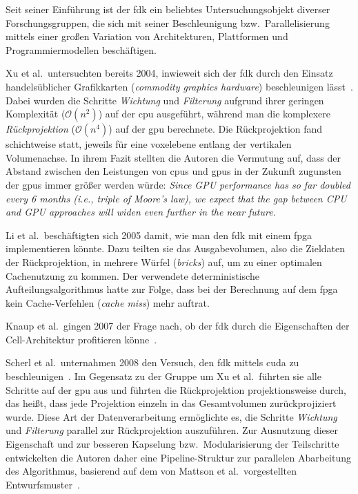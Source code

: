 Seit seiner Einführung ist der \gls{fdk} ein beliebtes Untersuchungsobjekt diverser Forschungsgruppen, die sich mit
seiner Beschleunigung bzw.\ Parallelisierung mittels einer großen Variation von Architekturen, Plattformen und
Programmiermodellen beschäftigen. 

Xu et al.\ untersuchten bereits 2004, inwieweit sich der \gls{fdk} durch den Einsatz handelsüblicher Grafikkarten
(\textit{commodity graphics hardware}) beschleunigen lässt~\cite{xumuell}. Dabei wurden die Schritte \textit{Wichtung}
und \textit{Filterung} aufgrund ihrer geringen Komplexität ($\mathcal{O}(n^2)$) auf der \gls{cpu} ausgeführt, während
man die komplexere \textit{Rückprojektion} ($\mathcal{O}(n^4)$) auf der \gls{gpu} berechnete. Die Rückprojektion fand
schichtweise statt, jeweils für eine \gls{voxel}ebene entlang der vertikalen Volumenachse. In ihrem Fazit stellten die
Autoren die Vermutung auf, dass der Abstand zwischen den Leistungen von \gls{cpu}s und \gls{gpu}s in der Zukunft
zugunsten der \gls{gpu}s immer größer werden würde: \textit{Since GPU performance has so far doubled every 6 months 
(i.e., triple of Moore's law), we expect that the gap between CPU and GPU approaches will widen even further in the near
future.}

Li et al.\ beschäftigten sich 2005 damit, wie man den \gls{fdk} mit einem \gls{fpga} implementieren könnte. Dazu teilten
sie das Ausgabevolumen, also die Zieldaten der Rückprojektion, in mehrere Würfel (\textit{bricks}) auf, um zu einer
optimalen Cachenutzung zu kommen. Der verwendete deterministische Aufteilungsalgorithmus hatte zur Folge, dass bei der
Berechnung auf dem \gls{fpga} kein Cache-Verfehlen (\textit{cache miss}) mehr auftrat.

Knaup et al.\ gingen 2007 der Frage nach, ob der \gls{fdk} durch die Eigenschaften der Cell-Architektur profitieren
könne~\cite{knaupsteck}.

Scherl et al.\ unternahmen 2008 den Versuch, den \gls{fdk} mittels \gls{cuda} zu beschleunigen~\cite{scherlkeck}. Im
Gegensatz zu der Gruppe um Xu et al.\ führten sie alle Schritte auf der \gls{gpu} aus und führten die Rückprojektion
projektionsweise durch, das heißt, dass jede Projektion einzeln in das Gesamtvolumen zurückprojiziert wurde. Diese Art
der Datenverarbeitung ermöglichte es, die Schritte \textit{Wichtung} und \textit{Filterung} parallel zur Rückprojektion
auszuführen. Zur Ausnutzung dieser Eigenschaft und zur besseren Kapselung bzw.\ Modularisierung der Teilschritte
entwickelten die Autoren daher eine Pipeline-Struktur zur parallelen Abarbeitung des Algorithmus, basierend auf dem von
Mattson et al.\ vorgestellten Entwurfsmuster~\cite{mattsan}.

